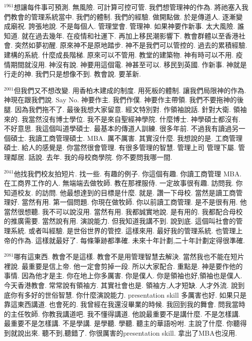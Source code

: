 \documentclass{book}
\begin{document}
$^{1961}$想讓每件事可預測.
無風險.
可計算可控可管.
我們想管理神的作為.
將祂塞入我們教會的管理系統當中.
我們的體制.
我們的經驗.
做開點做.
於是傳道人.
逐漸變成廟祝.
誇張地說.
不是每個人.
管理堂會.
管理神.
如果神要作新事.
太大風險.
誰知道.
就在過去幾年.
在疫情和社運下.
再加上移民潮影響下.
教會群體以至香港社會.
突然如夢初醒.
原來神不是原地踏步.
神不是我們可以管控的.
過去的累積經驗.
建構的系統.
什麼成長階梯.
原來可以不管用.
教堂的建築物.
神有時可以不用.
疫情期間就沒用.
神沒有說.
神要用這個電.
神甚至可以.
移民到英國.
作新事.
神就是行走的神.
我們只是想像不到.
教會說.
要革新.

$^{2001}$但我們又不想改變.
用香柏木建成的制度.
用死板的體制.
讓我們局限神的作為.
神現在跟我們說.
Say No.
神要作主.
我們作僕.
神要作主帶領.
我們不要拖神的後腿.
因為我們拖不了.
最後我想大家留意.
經文特別對.
作領袖說話.
針對大衛.
領袖來的.
我當然沒有博士學位.
我不是來自聖經神學院.
什麼博士.
神學碩士都沒有.
不好意思.
我這個叫道學碩士.
最基本的傳道人訓練.
很多年前.
不過我有讀過另一個碩士.
我讀工商管理碩士.
MBA.
厲不厲害.
其實沒什麼.
我想說的是.
工商管理碩士.
給人的感覺是.
你當然很會管理.
有很多管理的智慧.
管理上司 管理下屬.
管理鄰居.
話說.
去年.
我的母校商學院.
你不要問我哪一間.

$^{2041}$他找我們校友拍短片.
找一些.
有趣的例子.
你這個有趣.
你讀工商管理 MBA.
在工商界工作的人.
無端端去做牧師.
教在那裡服侍.
一定故事很有趣.
訪問我.
你知道校友.
的訪問.
他最想達到的目標是什麼.
就是.
讚一下母校.
當然是讀工商管理好.
當然有用.
第一個問題.
你現在做牧師.
你以前讀工商管理.
是不是很有用.
他當然很想聽.
我不可以說沒用.
當然有用.
我都誠實地說.
是有用的.
我都配合母校的推廣需要.
當然說有用.
演說能力.
但我知道我講不到.
說到底.
這個叫社會的管理系統.
或者叫經驗.
是世俗世界的管控.
這樣來用.
最好我的管理系統.
也管理上帝的作為.
這樣就最好了.
每條筆跡都準確.
未來十年計劃,二十年計劃定得很準確.

$^{2081}$哪有這東西.
教會不是這樣.
教會不是用管理智慧去解決.
當然我也不能在短片裡說.
最重要是信上帝.
他一定會剪掉一段.
所以大家配合.
重點是.
神是要作他的事情.
因為他才是主.
你在地上你多厲害.
你是僕人.
你是領袖也好,領袖也是僕人.
今天香港教會.
常常說有領袖方.
其實社會也是.
領袖方,人才短缺.
人才外流.
說到底你有多好的世俗智慧.
你什麼演說能力.
presentation skill 多厲害也好.
如果只是靠這東西講道.
也會死的.
我曾經在我還沒畢業的時候.
我回到我的舞會.
問我當時的主任牧師.
你教我講道吧.
我不懂得講道.
他說最重要不是講什麼.
不是怎樣講.
最重要不是怎樣講.
不是學講.
是學聽.
學聽.
聽主的華語吩咐.
主說了什麼.
你聽得到就說出來.
聽不到,聽錯了.
你很厲害的presentation skill.
拿出了MBA也沒用.
\end{document}
